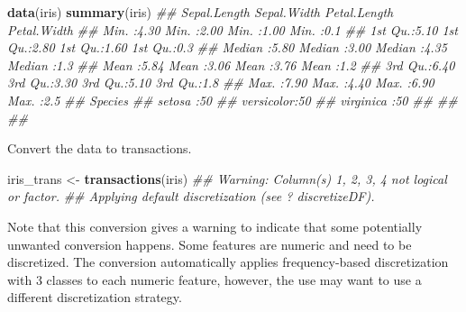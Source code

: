 \documentclass[
  notitlepage]{book}
\newenvironment{Shaded}{\begin{snugshade}}{\end{snugshade}}
\newcommand{\CommentTok}[1]{\textcolor[rgb]{0.56,0.35,0.01}{\textit{#1}}}
\newcommand{\KeywordTok}[1]{\textcolor[rgb]{0.13,0.29,0.53}{\textbf{#1}}}
\newcommand{\NormalTok}[1]{#1}
\newcommand{\StringTok}[1]{\textcolor[rgb]{0.31,0.60,0.02}{#1}}
\begin{document}
\begin{Shaded}
\begin{Highlighting}[]
\KeywordTok{data}\NormalTok{(iris)}
\KeywordTok{summary}\NormalTok{(iris)}
\CommentTok{\#\#   Sepal.Length   Sepal.Width    Petal.Length   Petal.Width }
\CommentTok{\#\#  Min.   :4.30   Min.   :2.00   Min.   :1.00   Min.   :0.1  }
\CommentTok{\#\#  1st Qu.:5.10   1st Qu.:2.80   1st Qu.:1.60   1st Qu.:0.3  }
\CommentTok{\#\#  Median :5.80   Median :3.00   Median :4.35   Median :1.3  }
\CommentTok{\#\#  Mean   :5.84   Mean   :3.06   Mean   :3.76   Mean   :1.2  }
\CommentTok{\#\#  3rd Qu.:6.40   3rd Qu.:3.30   3rd Qu.:5.10   3rd Qu.:1.8  }
\CommentTok{\#\#  Max.   :7.90   Max.   :4.40   Max.   :6.90   Max.   :2.5  }
\CommentTok{\#\#        Species  }
\CommentTok{\#\#  setosa    :50  }
\CommentTok{\#\#  versicolor:50  }
\CommentTok{\#\#  virginica :50  }
\CommentTok{\#\#                 }
\CommentTok{\#\#                 }
\CommentTok{\#\# }
\end{Highlighting}
\end{Shaded}

Convert the data to transactions.

\begin{Shaded}
\begin{Highlighting}[]
\NormalTok{iris\_trans \textless{}{-}}\StringTok{ }\KeywordTok{transactions}\NormalTok{(iris)}
\CommentTok{\#\# Warning: Column(s) 1, 2, 3, 4 not logical or factor.}
\CommentTok{\#\# Applying default discretization (see \textquotesingle{}? discretizeDF\textquotesingle{}).}
\end{Highlighting}
\end{Shaded}

Note that this conversion gives a warning to indicate that some potentially
unwanted conversion happens. Some features are numeric and
need to be discretized. The conversion automatically applies
frequency-based discretization with 3 classes to each numeric feature,
however, the use may want to use a different discretization strategy.
\end{document}
